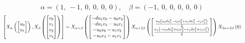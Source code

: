\documentclass[11pt]{article}
\theoremstyle{definition}
\begin{document}
\[
\alpha = \left( 1, \  -1, \  0, \  0, \  0, \  0\right), \quad \beta = \left( -1, \  0, \  0, \  0, \  0, \  0\right)
\]
\[
\scaletoalign{\textwidth}{\left[ X_{\alpha}\left(\left[\begin{matrix}u_{0}\\u_{1}\end{matrix}\right]\right), X_{\beta}\left(\left[\begin{matrix}v_{0}\\v_{1}\\v_{2}\\v_{3}\end{matrix}\right]\right) \right] = X_{\alpha + \beta}\left(\left[\begin{matrix}- d u_{1} v_{0} - u_{0} v_{2}\\- d u_{1} v_{3} - u_{0} v_{1}\\- u_{0} v_{0} - u_{1} v_{2}\\- u_{0} v_{3} - u_{1} v_{1}\end{matrix}\right]\right) X_{\alpha + 2\beta}\left(\left[\begin{matrix}\frac{u_{0} \left(c_{0} d v_{0}^{2} - c_{0} v_{2}^{2} + c_{1} d v_{3}^{2} - c_{1} v_{1}^{2}\right)}{2}\\\frac{u_{1} \left(- c_{0} d v_{0}^{2} + c_{0} v_{2}^{2} - c_{1} d v_{3}^{2} + c_{1} v_{1}^{2}\right)}{2}\end{matrix}\right]\right) X_{2\alpha + 2\beta}\left(0\right)}
\]
\end{document}
